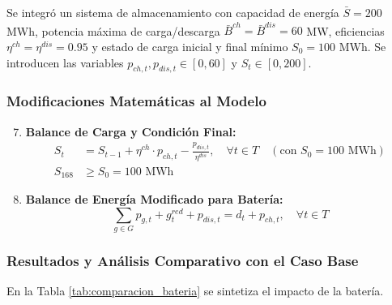 \documentclass[10pt,letterpaper]{article}
\begin{document}
Se integró un sistema de almacenamiento con capacidad de energía $\bar{S} = 200$ MWh, potencia máxima de carga/descarga $\bar{B}^{ch} = \bar{B}^{dis} = 60$ MW, eficiencias $\eta^{ch} = \eta^{dis} = 0.95$ y estado de carga inicial y final mínimo $S_0 = 100$ MWh. Se introducen las variables $p_{ch,t}, p_{dis,t} \in [0, 60]$ y $S_t \in [0, 200]$.

\subsubsection*{Modificaciones Matemáticas al Modelo}
\begin{enumerate}[label=\textbf{R\arabic*.}]
    \setcounter{enumi}{6}
    \item \textbf{Balance de Carga y Condición Final:}
    \begin{align}
        S_t &= S_{t-1} + \eta^{ch} \cdot p_{ch,t} - \frac{p_{dis,t}}{\eta^{dis}}, \quad \forall t \in T \quad (\text{con } S_0 = 100 \text{ MWh}) \label{eq:soc_bal} \\
        S_{168} &\ge S_0 = 100 \text{ MWh} \label{eq:soc_final}
    \end{align}
    \item \textbf{Balance de Energía Modificado para Batería:}
    \begin{equation}
        \sum_{g \in G} p_{g,t} + g_t^{red} + p_{dis,t} = d_t + p_{ch,t}, \quad \forall t \in T \label{eq:bal_bateria}
    \end{equation}
\end{enumerate}

\subsubsection*{Resultados y Análisis Comparativo con el Caso Base}
En la Tabla \ref{tab:comparacion_bateria} se sintetiza el impacto de la batería.
\end{document}
